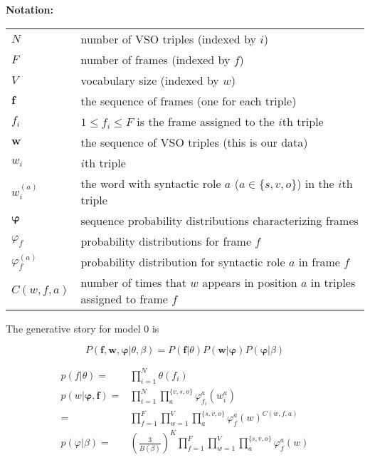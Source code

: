 \documentclass{article}
\begin{document}
\def\blw{\boldsymbol{w}}
\def\blf{\boldsymbol{f}}
\def\blphi{\boldsymbol{\phi}}
\renewcommand\phi\varphi


\textbf{Notation:}
\begin{table}[h]
\begin{tabular}{ll}
$N$                   & number of VSO triples (indexed by $i$)                      \\
$F$                   & number of frames (indexed by $f$)                       \\
$V$                   & vocabulary size (indexed by $w$)\footnotemark\\
$\blf$                   & the sequence of frames (one for each triple)        \\
$f_i$                 & $1\leq f_i\leq F$ is the frame assigned to the $i$th triple      \\
$\blw$           & the sequence of VSO triples (this is our data)                               \\
$ w_i$            & $i$th triple                                            \\
$w_i^{(a)}$           & the word with syntactic role $a$ ($a\in\{s,v,o\}$) in the $i$th triple \\
$\blphi$          & sequence probability distributions characterizing frames    \\
$\phi_f$          & probability distributions for frame $f$                  \\
$\phi_f^{(a)}$        & probability distribution for syntactic role $a$ in frame $f$ \\
$C(w,f,a)$          & number of times that $w$ appears in position $a$ in triples assigned to frame $f$\\
\end{tabular}
\end{table}

The generative story for model 0 is



\[
P(\blf,\blw,\blphi|\theta,\beta)
= P(\blf|\theta)P(\blw|\blphi)P(\blphi|\beta)
\]

\begin{align*}
p(f|\theta)      =& \prod_{i=1}^{N}\theta(f_i)\\
p(w|\blphi,\blf) =& \prod_{i=1}^N\prod_{a}^{\{v,s,o\}}\phi_{f_i}^a(w_i^a)\\
                 =& \prod_{f=1}^{F}\prod_{w=1}^{V}\prod_{a}^{\{s,v,o\}}\phi_f^a(w)^{C(w,f,a)}\\
p(\phi|\beta)    =& (\frac{3}{B(\beta)})^K\prod_{f=1}^{F}\prod_{w=1}^{V}\prod_{a}^{\{s,v,o\}}\phi_f^a(w)
\end{align*}
\end{document}

